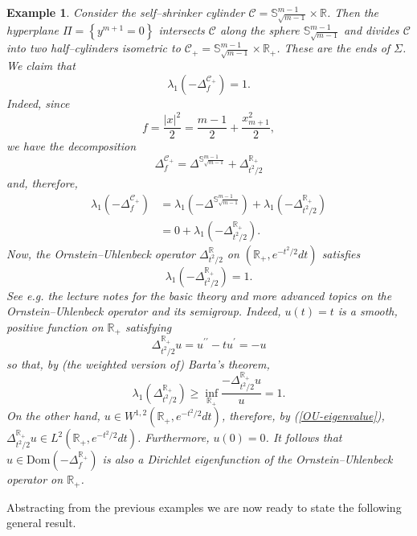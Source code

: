 \documentclass[11pt,leqno]{amsart}\usepackage{amsmath}
\newtheorem{example}[theorem]{Example}
\numberwithin{equation}{section}
\begin{document}
\begin{example}
\rm{Consider the self--shrinker cylinder $\mathcal{C}=\mathbb{S}_{\sqrt{m-1}}^{m-1}\times\mathbb{R}$. Then the hyperplane $\Pi=\left\{  y^{m+1}=0\right\}
$ intersects $\mathcal{C}$ along the sphere $\mathbb{S}_{\sqrt{m-1}}^{m-1}$ and divides $\mathcal{C}$ into two half--cylinders
isometric to $\mathcal{C}_{+}=\mathbb{S}_{\sqrt{m-1}}^{m-1}\times\mathbb{R}_{+}$. These are the ends of $\Sigma$. We claim that\[
\lambda_{1}(- \Delta_{f}^{\mathcal{C}_{+}})  =1.
\]
Indeed, since\[
f=\frac{|x|^{2}}{2}=\frac{m-1}{2}+\frac{x_{m+1}^{2}}{2},
\]
we have the decomposition\[
\Delta_{f}^{\mathcal{C}_{+}}=\Delta^{\mathbb{S}_{\sqrt{m-1}}^{m-1}}+\Delta_{t^{2}/2}^{\mathbb{R}_{+}}\]
and, therefore,\begin{align*}
\lambda_{1}( - \Delta_{f}^{\mathcal{C}_{+}})   &
=\lambda_{1}(-  \Delta^{\mathbb{S}_{\sqrt{m-1}}^{m-1}})  +\lambda_{1}
(-\Delta_{t^{2}/2}^{\mathbb{R}_{+}}) \\
&  =0+\lambda_{1}(-  \Delta_{t^{2}/2}^{\mathbb{R}_{+}})  .
\end{align*}
Now, the Ornstein--Uhlenbeck operator $\Delta_{t^{2}/2}^{\mathbb{R}}$ on
$(  \mathbb{R}_{+},e^{-t^{2}/2}dt)  $ satisfies\[
\lambda_{1}(-  \Delta_{t^{2}/2}^{\mathbb{R}_{+}})  =1.
\]
See e.g. the lecture notes \cite{Sj-lectures} for the basic theory and more advanced topics on the Ornstein--Uhlenbeck operator and its semigroup. Indeed, $u\left(  t\right)  =t$ is a smooth, positive function on $\mathbb{R}_{+}$
satisfying\begin{equation}\label{OU-eigenvalue}
\Delta_{t^{2}/2}^{\mathbb{R}_{+}}u=u^{\prime\prime}-tu^{\prime}=-u
\end{equation}
so that, by (the weighted version of) Barta's theorem,
\[
\lambda_{1}(  \Delta_{t^{2}/2}^{\mathbb{R}_{+}})  \geq \inf_{\mathbb{R}_{+}} \frac
{-\Delta_{t^{2}/2}^{\mathbb{R}_{+}}u}{u}=1.
\]
On the other hand, $u\in W^{1,2}(
\mathbb{R}_{+},e^{-t^{2}/2}dt)  $, therefore, by (\ref{OU-eigenvalue}), $\Delta_{t^{2}/2}^{\mathbb{R}_{+}}u \in L^2(\mathbb{R}_{+},e^{-t^{2}/2}dt)  $. Furthermore,  $u\left(  0\right)  =0$. It follows that $u \in \mathrm{Dom}(-\Delta_{f}^{\mathbb{R}_{+}})$ is also a Dirichlet
eigenfunction of the Ornstein--Uhlenbeck operator on $\mathbb{R}_{+}$.}
\end{example}

Abstracting from the previous examples we are now ready to state the following general result.
\end{document}
